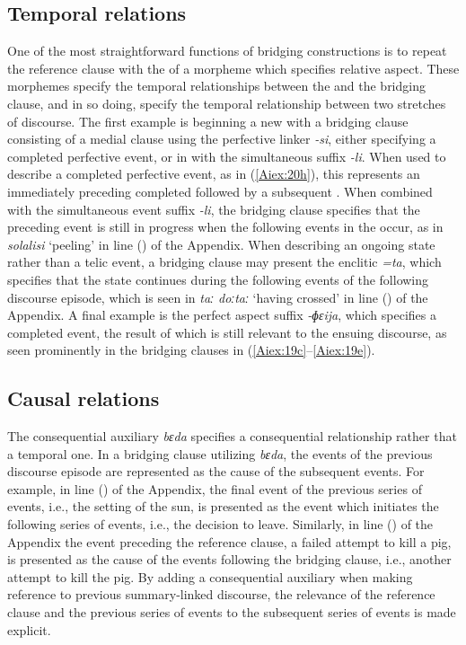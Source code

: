 \documentclass[output=paper]{LSP/langsci}
\begin{document}
\subsection{Temporal relations} 
\label{AiTemporal}
One of the most straightforward functions of bridging constructions is to repeat the reference clause with the  of a morpheme which specifies relative aspect. These morphemes specify the temporal relationships between the  and the bridging clause, and in so doing, specify the temporal relationship between two stretches of discourse. The first example is beginning a new  with a bridging clause consisting of a medial clause using the perfective linker \textit{-si}, either specifying a completed perfective event, or in  with the simultaneous  suffix \textit{-li}. When used to describe a completed perfective event, as in (\ref{Aiex:20h}), this represents an immediately preceding completed  followed by a subsequent . When combined with the simultaneous event suffix \textit{-li}, the bridging clause specifies that the preceding event is still in progress when the following events in the  occur, as in \textit{solalisi} `peeling' in line () of the Appendix. When describing an ongoing state rather than a telic event, a bridging clause may present the enclitic \textit{=ta}, which specifies that the state continues during the following events of the following discourse episode, which is seen in \textit{taː doːtaː} `having crossed' in line () of the Appendix. A final example is the perfect aspect suffix \textit{-ɸɛija}, which specifies a completed event, the result of which is still relevant to the ensuing discourse, as seen prominently in the bridging clauses in (\ref{Aiex:19c}--\ref{Aiex:19e}).

\subsection{Causal relations} 
\label{AiCausal}
The consequential auxiliary \textit{bɛda} specifies a consequential relationship rather that a temporal one. In a bridging clause utilizing \textit{bɛda}, the events of the previous discourse episode are represented as the cause of the subsequent events. For example, in line () of the Appendix, the final event of the previous series of events, i.e., the setting of the sun, is presented as the event which initiates the following series of events, i.e., the decision to leave. Similarly, in line () of the Appendix the event preceding the reference clause, a failed attempt to kill a pig, is presented as the cause of the events following the bridging clause, i.e., another attempt to kill the pig. By adding a consequential auxiliary when making reference to previous summary-linked discourse, the relevance of the reference clause and the previous series of events to the subsequent series of events is made explicit.
	
\end{document}
